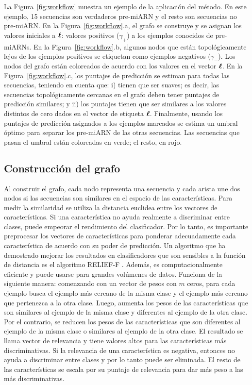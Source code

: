 La Figura~\ref{fig:workflow} muestra un ejemplo de la aplicación del método. En este ejemplo, 15 secuencias son verdaderos pre-miARN y el resto son secuencias
no pre-miARN. En la Figura~\ref{fig:workflow}.a, el grafo se construye y se asignan los valores iniciales a $\boldsymbol\ell$: valores positivos ($\gamma_{+}$) a los
ejemplos conocidos de pre-miARNs. En la Figura~\ref{fig:workflow}.b, algunos nodos que están topológicamente lejos de los ejemplos positivos se etiquetan como
ejemplos negativos ($\gamma_{-}$). Los nodos del grafo están coloreados de acuerdo con los valores en el vector $\boldsymbol\ell$. En la Figura~\ref{fig:workflow}.c,
los puntajes de predicción se estiman para todas las secuencias, teniendo en cuenta que: i) tienen que ser suaves; es decir, las secuencias topológicamente
cercanas en el grafo deben tener puntajes de predicción similares; y ii) los puntajes tienen que ser similares a los valores distintos de cero dados en el
vector de etiqueta $\boldsymbol\ell$. Finalmente, usando los puntajes de predicción asignados a los ejemplos marcados se estima un umbral óptimo para separar los
pre-miARN de las otras secuencias. Las secuencias que pasan el umbral están coloreadas en verde; el resto, en rojo.

\subsection{Construcción del grafo}

Al construir el grafo, cada nodo representa una secuencia y cada arista une dos nodos si las secuencias son similares en el espacio de las características. Para
medir la similaridad se utiliza la distancia euclidea entre los vectores de características. Si una característica no ayuda realmente a discriminar entre
clases, puede empeorar el rendimiento del clasificador. Por lo tanto, es importante preprocesar los vectores de características para ponderar adecuadamente cada
característica de acuerdo con su poder de predicción. Un algoritmo que ha demostrado mejorar los resultados en clasificadores que son sensibles a la función de
distancia es el algoritmo RELIEF-F \citep{kononenko1994estimating, wettschereck1997review}. Además, es computacionalmente eficiente y puede usarse para grandes
volúmenes de datos. Funciona de la siguiente manera: comenzando con un vector de pesos con $m$ ceros, para cada ejemplo busca el ejemplo más cercano de la misma
clase y el ejemplo más cercano que pertenezca a la otra clase. Luego, aumenta los pesos de las características que son similares al ejemplo de la misma clase y
diferentes al ejemplo de la otra clase. Por el contrario, se reducen los pesos de las características que son diferentes al ejemplo de la misma clase o
similares al ejemplo de la otra clase. El resultado se llama vector de relevancia y tiene valores altos para las características más discriminativas. Si la
relevancia de una característica es negativa, entonces no ayuda a discriminar entre clases y por lo tanto puede ser eliminada. El resto de las características se escala
por su puntaje de relevancia para dar más peso a las más discriminativas.

